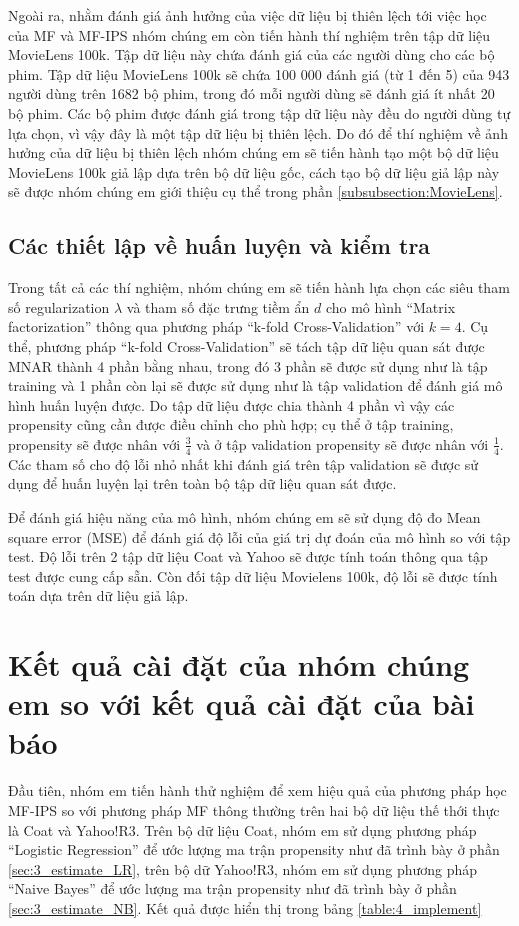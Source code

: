 Ngoài ra, nhằm đánh giá ảnh hưởng của việc dữ liệu bị thiên lệch tới việc học của MF và MF-IPS nhóm chúng em còn tiến hành thí nghiệm trên tập dữ liệu MovieLens 100k. Tập dữ liệu này chứa đánh giá của các người dùng cho các bộ phim. Tập dữ liệu MovieLens 100k sẽ chứa 100 000 đánh giá (từ 1 đến 5) của 943 người dùng trên 1682 bộ phim, trong đó mỗi người dùng sẽ đánh giá ít nhất 20 bộ phim. Các bộ phim được đánh giá trong tập dữ liệu này đều do người dùng tự lựa chọn, vì vậy đây là một tập dữ liệu bị thiên lệch. Do đó để thí nghiệm về ảnh hưởng của dữ liệu bị thiên lệch nhóm chúng em sẽ tiến hành tạo một bộ dữ liệu MovieLens 100k giả lập dựa trên bộ dữ liệu gốc, cách tạo bộ dữ liệu giả lập này sẽ được nhóm chúng em giới thiệu cụ thể trong phần \ref{subsubsection:MovieLens}.

\subsection{Các thiết lập về huấn luyện và kiểm tra}
Trong tất cả các thí nghiệm, nhóm chúng em sẽ tiến hành lựa chọn các siêu tham số regularization $\lambda$ và tham số đặc trưng tiềm ẩn $d$ cho mô hình ``Matrix factorization'' thông qua phương pháp ``k-fold Cross-Validation'' với $k=4$. Cụ thể, phương pháp ``k-fold Cross-Validation'' sẽ tách tập dữ liệu quan sát được MNAR thành 4 phần bằng nhau, trong đó 3 phần sẽ được sử dụng như là tập training và 1 phần còn lại sẽ được sử dụng như là tập validation để đánh giá mô hình huấn luyện được. Do tập dữ liệu được chia thành 4 phần vì vậy các propensity cũng cần được điều chỉnh cho phù hợp; cụ thể ở tập training, propensity sẽ được nhân với $\frac{3}{4}$ và ở tập validation propensity sẽ được nhân với $\frac{1}{4}$. Các tham số cho độ lỗi nhỏ nhất khi đánh giá trên tập validation sẽ được sử dụng để huấn luyện lại trên toàn bộ tập dữ liệu quan sát được. 

Để đánh giá hiệu năng của mô hình, nhóm chúng em sẽ sử dụng độ đo Mean square error (MSE) để đánh giá độ lỗi của giá trị dự đoán của mô hình so với tập test. Độ lỗi trên 2 tập dữ liệu Coat và Yahoo sẽ được tính toán thông qua tập test được cung cấp sẵn. Còn đối tập dữ liệu Movielens 100k, độ lỗi sẽ được tính toán dựa trên dữ liệu giả lập.


\section{Kết quả cài đặt của nhóm chúng em so với kết quả cài đặt của bài báo}
Đầu tiên, nhóm em tiến hành thử nghiệm để xem hiệu quả của phương pháp học MF-IPS so với phương pháp MF thông thường trên hai bộ dữ liệu thế thới thực là Coat và Yahoo!R3. Trên bộ dữ liệu Coat, nhóm em sử dụng phương pháp ``Logistic Regression'' để ước lượng ma trận propensity như đã trình bày ở phần \ref{sec:3_estimate_LR}, trên bộ dữ Yahoo!R3, nhóm em sử dụng phương pháp ``Naive Bayes'' để ước lượng ma trận propensity như đã trình bày ở phần \ref{sec:3_estimate_NB}. Kết quả được hiển thị trong bảng \ref{table:4_implement}

